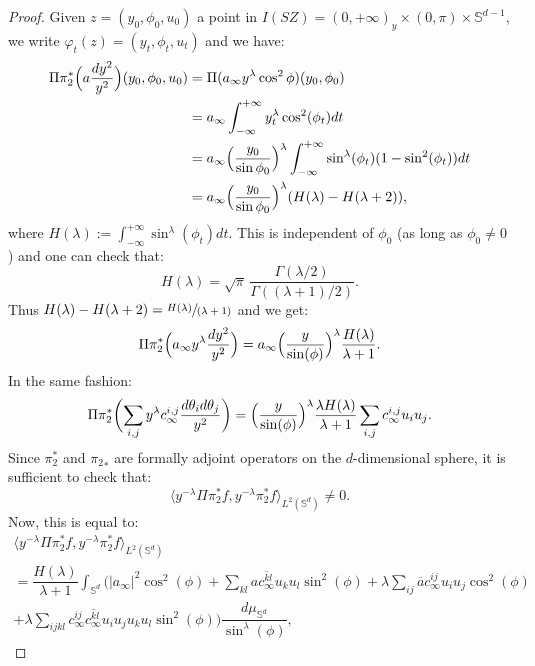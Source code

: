 \documentclass[10pt]{amsart}
\newcommand{\spfrac}[2]{\sfrac{#1}{(#2)}}
\newcommand{\Ss}{\mathbb{S}}
\theoremstyle{plain}
\theoremstyle{definition}
\begin{document}
\begin{proof}
Given $z=(y_0,\phi_0,u_0)$ a point in $I(SZ) = (0,+\infty)_y \times (0,\pi) \times \Ss^{d-1}$, we write $\varphi_t(z)=(y_t,\phi_t,u_t)$ and we have:
\[
\begin{split}
\Pi \pi^*_2 \Bigl(a \dfrac{dy^2}{y^2}\Bigr)(y_0,\phi_0,u_0) & = \Pi(a_\infty y^\lambda \cos^2 \phi)(y_0,\phi_0) \\
& = a_\infty \int_{-\infty}^{+\infty} y_t^\lambda \cos^2(\phi_t) dt \\
& = a_\infty \Bigl(\dfrac{y_0}{\sin \phi_0}\Bigr)^\lambda \int_{-\infty}^{+\infty} \sin^\lambda(\phi_t)(1-\sin^2(\phi_t)) dt \\
& = a_\infty \Bigl(\dfrac{y_0}{\sin \phi_0}\Bigr)^\lambda (H(\lambda)-H(\lambda+2)),
\end{split}
\]
where $H(\lambda) := \int_{-\infty}^{+\infty} \sin^\lambda(\phi_t) dt$. This is independent of $\phi_0$ (as long as $\phi_0 \neq 0$) and one can check that:
\begin{equation}
H(\lambda) = \sqrt{\pi}\,\dfrac{\Gamma(\lambda/2)}{\Gamma((\lambda+1)/2)}.
\end{equation}
Thus $H(\lambda)-H(\lambda+2) = \spfrac{H(\lambda)}{\lambda+1}$ and we get:
\begin{equation}
\Pi \pi_2^*\Bigl(a_\infty y^\lambda \dfrac{dy^2}{y^2}\Bigr) = a_\infty \Bigl(\dfrac{y}{\sin(\phi)}\Bigr)^\lambda \dfrac{H(\lambda)}{\lambda+1}.
\end{equation}
In the same fashion:
\begin{equation}
\Pi \pi_2^*\biggl(\sum_{i,j} y^\lambda c^{i,j}_\infty \dfrac{d\theta_i d\theta_j}{y^2}\biggr) = \Bigl(\dfrac{y}{\sin(\phi)}\Bigr)^\lambda \dfrac{\lambda H(\lambda)}{\lambda+1} \sum_{i,j} c_\infty^{i,j} u_i u_j.
\end{equation}
Since $\pi_2^*$ and ${\pi_2}_*$ are formally adjoint operators on the $d$-dimensional sphere, it is sufficient to check that:
\[ \langle y^{-\lambda} \Pi \pi_2^\ast f,y^{-\lambda}\pi_2^\ast f \rangle_{L^2(\Ss^d)} \neq 0. \]
Now, this is equal to:\vspace*{-5pt}
\begin{multline*}
\langle y^{-\lambda} \Pi \pi_2^\ast f,y^{-\lambda}\pi_2^\ast f \rangle_{L^2(\Ss^d)} \\
= \dfrac{H(\lambda)}{\lambda+1} \int_{\Ss^d} \biggl(|a_\infty|^2 \cos^2(\phi) + \sum_{kl} a \overline{c^{kl}_\infty} u_k u_l \sin^2(\phi) + \lambda \sum_{ij} \overline{a} c^{ij}_\infty u_i u_j \cos^2(\phi)\\[-5pt]
+\lambda \sum_{ijkl} c^{ij}_\infty\overline{c^{kl}_\infty}u_iu_ju_ku_l \sin^2(\phi)\biggr) \dfrac{d\mu_{\Ss^d}}{\sin^\lambda(\phi)},

\end{multline*}
\end{proof}
\end{document}
